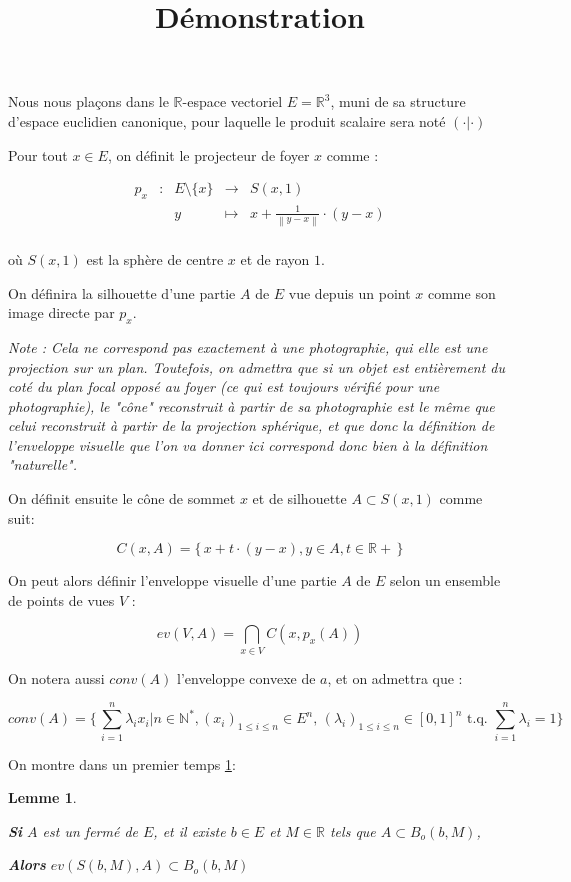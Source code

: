 \documentclass[a4paper]{article}
\title{Démonstration}
\newcommand{\norm}[1]{\left\lVert#1\right\rVert}
\newtheorem{lem}{Lemme}
\begin{document}
Nous nous plaçons dans le $\mathbb{R}$-espace vectoriel $E = \mathbb{R}^{3}$, muni de sa structure d'espace euclidien canonique, pour laquelle le produit scalaire sera noté $(\cdot|\cdot)$


Pour tout $x\in E$, on définit le projecteur de foyer $x$ comme :

\[\begin{array}{ccccc}
p_{x} & : & E\setminus\{x\} & \to & S(x, 1) \\
 & & y & \mapsto & x  + \frac{1}{\norm{y - x}} \cdot (y - x) \\
\end{array}\]

où $S(x, 1)$ est  la sphère de centre $x$ et de rayon $1$.


On définira la silhouette d'une  partie $A$ de $E$ vue depuis un point $x$ comme son image directe par $p_{x}$.

\textit{Note : Cela ne correspond pas exactement à une photographie, qui elle est une projection sur un plan. Toutefois, on admettra que si un objet est entièrement du coté du plan focal opposé au foyer (ce qui est toujours vérifié pour une photographie), le "cône" reconstruit à partir de sa photographie est le même que celui reconstruit à partir de la projection sphérique, et que donc la définition de l'enveloppe visuelle que l'on va donner ici correspond donc bien à la définition "naturelle".}

On définit ensuite le cône de sommet $x$ et de silhouette $A \subset S(x, 1)$ comme suit:

\[C(x,A) = \{\,x + t\cdot{}(y - x), y\in{}A, t\in\mathbb{R}+\,\}\]

On peut alors définir l'enveloppe visuelle d'une partie $A$ de $E$ selon un ensemble de points de vues $V$ :

\[ev(V, A) = \bigcap_{x\in{}V}C(x,p_{x}(A))\]

On notera aussi $conv(A)$ l'enveloppe convexe de $a$, et on admettra que :

\[conv(A) = \{\,\sum_{i=1}^{n} \lambda_{i} x_{i}| n\in{}\mathbb{N}^{*}, (x_{i})_{1\leqslant i \leqslant n} \in E^{n}, \, (\lambda_{i})_{1\leqslant i \leqslant n} \in [0, 1]^{n}\text{ t.q. } \sum_{i=1}^{n} \lambda_{i} = 1\}\]

On montre dans un premier temps \ref{lem1}:

\begin{lem}\label{lem1}

\textbf{Si} $A$ est un fermé de $E$, et il existe $b \in E$ et $M \in \mathbb{R}$ tels que $A \subset B_{o}(b, M)$,

\textbf{Alors} $ev(S(b,M), A) \subset B_{o}(b, M)$

\end{lem}
\end{document}
